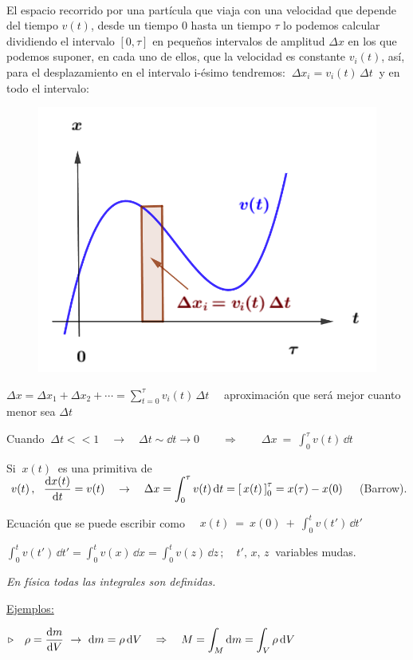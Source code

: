\begin{multicols}{2}
$\quad$

El espacio recorrido por una partícula que viaja con una velocidad que depende del tiempo $v(t)$, desde un tiempo $0$ hasta un tiempo $\tau$ lo podemos calcular dividiendo el intervalo $[0,\tau]$ en pequeños intervalos de amplitud $\Delta x$ en los que podemos suponer, en cada uno de ellos, que la velocidad es constante $v_i(t)$, así, para el desplazamiento en el intervalo i-ésimo tendremos: $\ \Delta x_i=v_i(t)\, \Delta t\ $ y en todo el intervalo:
\begin{figure}[H]
	\centering
	\includegraphics[width=.4\textwidth]{imagenes/T02IM02.png}
\end{figure}
\end{multicols}

$\displaystyle \Delta x=\Delta x_1+ \Delta x_2+ \cdots = \sum_{t=0}^\tau v_i(t)\, \Delta t \quad $ aproximación que será mejor cuanto menor sea $	\Delta t$

Cuando $ \ \displaystyle  \Delta t  << 1 \quad \to  \quad \Delta t \sim \dd t \to 0 \qquad \Rightarrow \qquad \Delta x \ = \ \int_0^\tau  v(t)\, \dd t$


Si $\ x(t)\ $ es una primitiva de $\ v(t)\, , \ \ \displaystyle \dv{x(t)}{t}=v(t) \quad \to \quad \displaystyle \Delta x=  \int_0^\tau  v(t)\, \dd t = \left[\,  x(t) \, \right]_0^\tau=x(\tau)-x(0) \quad$ (Barrow).

Ecuación que se puede escribir como $\quad\displaystyle x(t)\ = \ x(0) \ + \ \int_0^t  v(t')\, \dd t' \ $

\textcolor{gris}{$\displaystyle \int_0^t  v(t')\, \dd t' =\int_0^t  v(x)\, \dd x =\int_0^t  v(z)\, \dd z\, ;  \quad t',\, x,\, z\ $ variables mudas. } 

\vspace{5mm}\emph{En física todas las integrales son definidas.}

\vspace{5mm}\ul{Ejemplos:}

\hspace{1cm} \vspace{3mm} $\triangleright \displaystyle \quad \rho=\dv{m}{V} \ \to \ \dd m = \rho\, \dd V  \quad \Rightarrow \quad M=\int_M \dd m = \int_V \rho\, \dd V$

